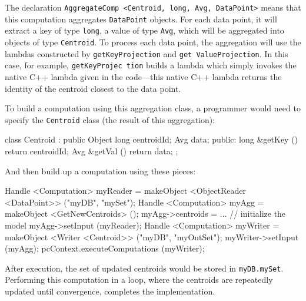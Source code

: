 \noindent 
The declaration \texttt{AggregateComp <Centroid, long, Avg, DataPoint>} means that this computation aggregates
\texttt{DataPoint} objects.  For each data point, it will extract a key of type \texttt{long}, a value of type \texttt{Avg}, which will be
aggregated into objects of type \texttt{Centroid}.  To process each data point, the aggregation will use the lambdas constructed by
\texttt{getKeyProjection} and \texttt{get ValueProjection}.  
In this case, for example,
\texttt{getKeyProjec tion} builds a lambda which simply invokes the native C++ lambda given in the code---this
native C++ lambda returns the identity of the centroid closest to the data point.

To build a computation using this aggregation class, a programmer would need to specify the \texttt{Centroid} class (the result of this aggregation):

\begin{codesmall}
class Centroid : public Object {
	long centroidId; 
	Avg data;
public:
	long &getKey () {return centroidId;}
	Avg &getVal () {return data;}
};
\end{codesmall}

\noindent
And then build up a computation using these pieces:

\begin{codesmall}
Handle <Computation> myReader = 
    makeObject <ObjectReader <DataPoint>>
     ("myDB", "mySet");
Handle <Computation> myAgg = makeObject 
    <GetNewCentroids> ();
myAgg->centroids = ... // initialize the model
myAgg->setInput (myReader);
Handle <Computation> myWriter =  makeObject <Writer
     <Centroid>> ("myDB", "myOutSet");
    myWriter->setInput (myAgg);
pcContext.executeComputations (myWriter);
\end{codesmall}

\noindent After execution, the set of updated centroids would be stored in \texttt{myDB.mySet}.
Performing this computation in a loop, where the centroids are repeatedly updated until convergence, completes the implementation.

